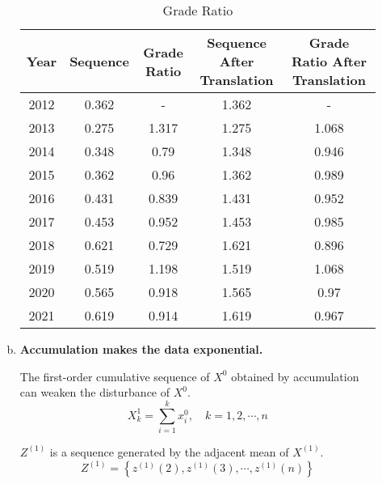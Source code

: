 \documentclass[12pt]{article}
\begin{document}
\begin{description}
\begin{enumerate}[a)]
			\begin{table}[!htbp]
				\begin{center}
					\caption{Grade Ratio}
					\label{tb:grade_ratio}
					\begin{tabular}{ccccc}
						\toprule
						\multicolumn{1}{m{2cm}}{\centering \textbf{Year}}
						& \multicolumn{1}{m{2cm}}{\centering \textbf{Sequence}}
						& \multicolumn{1}{m{3cm}}{\centering \textbf{Grade Ratio}}
						& \multicolumn{1}{m{3cm}}{\centering \textbf{Sequence After Translation}}
						& \multicolumn{1}{m{3cm}}{\centering \textbf{Grade Ratio After Translation}}\\
						\midrule
						2012 & 0.362 & - & 1.362 & - \\
						2013 & 0.275 & 1.317 & 1.275 & 1.068 \\
						2014 & 0.348 & 0.79 & 1.348 & 0.946 \\
						2015 & 0.362 & 0.96 & 1.362 & 0.989 \\
						2016 & 0.431 & 0.839 & 1.431 & 0.952 \\
						2017 & 0.453 & 0.952 & 1.453 & 0.985 \\
						2018 & 0.621 & 0.729 & 1.621 & 0.896 \\
						2019 & 0.519 & 1.198 & 1.519 & 1.068 \\
						2020 & 0.565 & 0.918 & 1.565 & 0.97 \\
						2021 & 0.619 & 0.914 & 1.619 & 0.967 \\
						\bottomrule
					\end{tabular}
				\end{center}
				
			\end{table}	
			
			\newpage
			
			\item \textbf{Accumulation makes the data exponential.}
			
			The first-order cumulative sequence of $X^{0}$ obtained by accumulation can weaken the disturbance of $X^{0}$.
			\begin{equation}\label{eq:add}
				X_{k}^{1} = \sum_{i=1}^{k} x_{i}^{0}, \quad k = 1,2,\cdots,n
			\end{equation}
			
			$Z^{(1)}$ is a sequence generated by the adjacent mean of $X^{(1)}$.
			\begin{equation}\label{eq:adjacent1}
				Z^{(1)} = \left\{ z^{(1)}(2), z^{(1)}(3), \cdots, z^{(1)}(n) \right\}
			\end{equation}
		

\end{enumerate}
\end{description}
\end{document}
